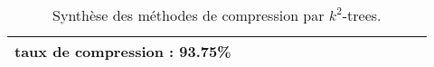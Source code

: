 \begin{landscape}
\begin{table}
\begin{tabular}{|C{3cm}|c|c|c|c|c|c|c|c|c|c|c|c|c|}
\begin{minipage}[t]{0.35\textwidth}
	 taux de compression : 93.75\% 
  \end{minipage}	\\  				
  				\hline 
				
									\end{tabular}
									\caption{Synthèse des méthodes de compression par $k^2$-trees.}									
									
								\end{table}
								
							\end{landscape}				